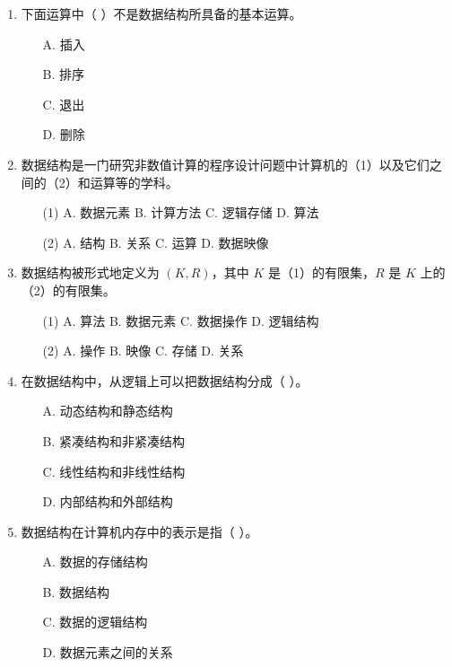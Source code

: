 \documentclass[12pt, a4paper]{article}
\begin{document}
\begin{enumerate}
    \item 下面运算中（ ）不是数据结构所具备的基本运算。
    \begin{enumerate}
        \item[A.] 插入
        \item[B.] 排序
        \item[C.] 退出
        \item[D.] 删除
    \end{enumerate}
    
    \item 数据结构是一门研究非数值计算的程序设计问题中计算机的（1）以及它们之间的（2）和运算等的学科。
    \begin{enumerate}
        \item[(1)] A. 数据元素 \quad B. 计算方法 \quad C. 逻辑存储 \quad D. 算法
        \item[(2)] A. 结构 \quad B. 关系 \quad C. 运算 \quad D. 数据映像
    \end{enumerate}
    
    \item 数据结构被形式地定义为 $(K, R)$，其中 $K$ 是（1）的有限集，$R$ 是 $K$ 上的（2）的有限集。
    \begin{enumerate}
        \item[(1)] A. 算法 \quad B. 数据元素 \quad C. 数据操作 \quad D. 逻辑结构
        \item[(2)] A. 操作 \quad B. 映像 \quad C. 存储 \quad D. 关系
    \end{enumerate}
    
    \item 在数据结构中，从逻辑上可以把数据结构分成（ ）。
    \begin{enumerate}
        \item[A.] 动态结构和静态结构
        \item[B.] 紧凑结构和非紧凑结构
        \item[C.] 线性结构和非线性结构
        \item[D.] 内部结构和外部结构
    \end{enumerate}
    
    \item 数据结构在计算机内存中的表示是指（ ）。
    \begin{enumerate}
        \item[A.] 数据的存储结构
        \item[B.] 数据结构
        \item[C.] 数据的逻辑结构
        \item[D.] 数据元素之间的关系
    \end{enumerate}
    

\end{enumerate}
\end{document}

